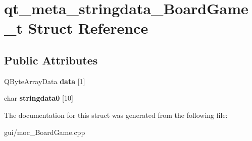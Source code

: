 \hypertarget{structqt__meta__stringdata___board_game__t}{}\section{qt\+\_\+meta\+\_\+stringdata\+\_\+\+Board\+Game\+\_\+t Struct Reference}
\label{structqt__meta__stringdata___board_game__t}
\subsection*{Public Attributes}
\begin{DoxyCompactItemize}
\item 
\mbox{\label{structqt__meta__stringdata___board_game__t_ad8d5a45c2b8b55bcfc00915ea0969db6}} 
Q\+Byte\+Array\+Data {\bfseries data} \mbox{[}1\mbox{]}
\item 
\mbox{\label{structqt__meta__stringdata___board_game__t_a1690942355d0f1303ef607b2c77fa2ae}} 
char {\bfseries stringdata0} \mbox{[}10\mbox{]}
\end{DoxyCompactItemize}


The documentation for this struct was generated from the following file\+:\begin{DoxyCompactItemize}
\item 
gui/moc\+\_\+\+Board\+Game.\+cpp\end{DoxyCompactItemize}
